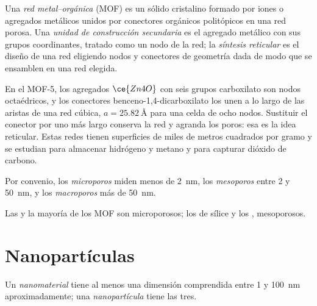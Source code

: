 \begin{definition}\label{def:b3:inorganic-materials:mof}
Una \emph{red metal--orgánica} (MOF) es un
sólido cristalino formado por iones o agregados metálicos unidos por conectores
orgánicos politópicos en una red porosa. Una \emph{unidad de construcción
secundaria} es el agregado metálico con sus
grupos coordinantes, tratado como un nodo de la red; la \emph{síntesis
reticular} es el diseño de una red eligiendo
nodos y conectores de geometría dada de modo que se ensamblen en una red elegida.
\end{definition}

En el MOF-5, los agregados $\ce{Zn4O}$ con seis grupos carboxilato son nodos octaédricos,
y los conectores benceno-1,4-dicarboxilato los unen a lo largo de las aristas de una red
cúbica, $a = \qty{25.82}{\angstrom}$ para una celda de ocho nodos. Sustituir el conector por uno
más largo conserva la red y agranda los poros: esa es la idea reticular. Estas
redes tienen superficies de miles de metros cuadrados por gramo y se
estudian para almacenar hidrógeno y metano y para capturar dióxido de carbono.

\begin{definition}\label{def:b3:inorganic-materials:pores}
Por convenio, los \emph{microporos} miden menos de \qty{2}{nm},
los \emph{mesoporos} entre 2 y \qty{50}{nm}, y
los \emph{macroporos} más de \qty{50}{nm}.
\end{definition}

Las  y la mayoría de los MOF son microporosos; los  de sílice y los , mesoporosos.

\section{Nanopartículas}

\begin{definition}[Nanomateriales]\label{def:b3:inorganic-materials:nano}
Un \emph{nanomaterial} tiene al menos una dimensión comprendida entre
1 y \qty{100}{nm} aproximadamente; una \emph{nanopartícula} tiene las
tres.
\end{definition}

